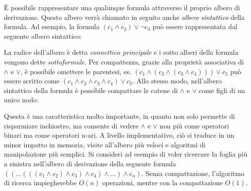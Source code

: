 \documentclass[./main.tex]{subfiles}
\begin{document}
È possibile rappresentare una qualunque formula attraverso il proprio albero di derivazione. Questo albero 
verrà chiamato in seguito anche \textit{albero sintattico} della formula. Ad esempio, la formula 
$(c_1 \land c_2) \lor \lnot c_3$ può essere rappresentata dal seguente albero sintattico:

\begin{center}
\end{center}


La radice dell'albero è detta \textit{connettivo principale} e i sotto alberi della formula vengono dette \textit{sottoformule}.
 Per compattezza, grazie alla proprietà associativa di $\land$ e $\lor$, è possibile omettere le parentesi, es. 
$(c_1 \land (c_2 \land (c_3 \land c_4))) \lor c_5$ può essere scritto come $(c_1 \land c_2 \land c_3 \land c_4) \lor c_5$. 
Allo stesso modo, nell'albero sintattico della formula è possibile compattare le catene di $\land$ e $\lor$ come figli di un unico nodo:

\begin{center}
\end{center}

Questa è una caratteristica molto importante, in quanto non solo permette di risparmiare inchiostro, ma consente di vedere
$\land$ e $\lor$ non più come operatori binari ma come operatori n-ari. A livello implementativo, ciò si traduce in un minor
impatto in memoria, visite all'albero più veloci e algoritmi di manipolazione più semplici. Si consideri ad esempio di voler ricercare la 
foglia più a sinistra nell'albero di derivazione della seguente formula $(( ... (((c_1 \land c_2) \land c_3) \land c_4) \land ... )\land c_n)$.
Senza compattazione, l'algoritmo di ricerca impiegherebbe $O(n)$ operazioni, mentre con la compattazione $O(1)$.
\end{document}
